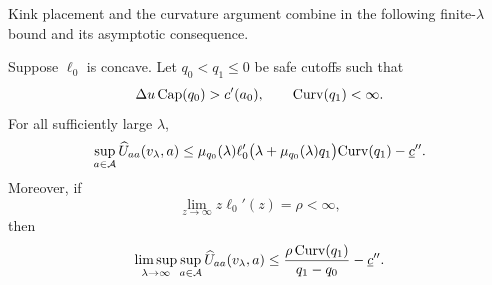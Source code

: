 Kink placement and the curvature argument combine in the following
finite-$\lambda$ bound and its asymptotic consequence.

\begin{proposition}
\label{prop:finite-lambda-bound}
Suppose $\ell_0$ is concave.  Let $q_0<q_1\leq0$ be safe cutoffs such that
\[
    \Delta u\,\mathrm{Cap}(q_0)>c'(a_0),
    \qquad \mathrm{Curv}(q_1)<\infty.
\]
For all sufficiently large $\lambda$,
\begin{equation}
 \sup_{a\in\mathcal A}\widehat U_{aa}(v_\lambda,a)
 \leq
 \mu_{q_0}(\lambda)
 \ell_0'\bigl(\lambda+\mu_{q_0}(\lambda)q_1\bigr)\mathrm{Curv}(q_1)
 -\underline c''.
 \label{eq:finite-lambda-bound}
\end{equation}
Moreover, if
\[
    \lim_{z\to\infty}z\ell_0'(z)=\rho<\infty,
\]
then
\begin{equation}
 \limsup_{\lambda\to\infty}\sup_{a\in\mathcal A}
 \widehat U_{aa}(v_\lambda,a)
 \leq
 \frac{\rho\,\mathrm{Curv}(q_1)}{q_1-q_0}-\underline c''.
 \label{eq:asymptotic-safe-tail-bound}
\end{equation}
\end{proposition}

